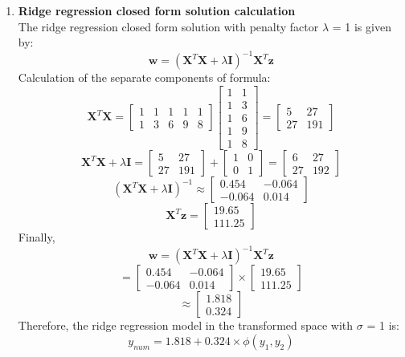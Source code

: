 \documentclass{article}
\begin{document}
\begin{enumerate}[leftmargin=\labelsep]
\item 
\textbf{Ridge regression closed form solution calculation}\\
The ridge regression closed form solution with penalty factor $\lambda$ = 1 is given by:
\[\boldsymbol{w} = (\mathbf{X}^T \mathbf{X} + \lambda \mathbf{I})^{-1} \mathbf{X}^T \mathbf{z}\]
Calculation of the separate components of formula:
\[
\mathbf{X}^T \mathbf{X} = 
\begin{bmatrix}
1 & 1 & 1 & 1 & 1 \\
1 & 3 & 6 & 9 & 8
\end{bmatrix}
\begin{bmatrix}
1 & 1 \\
1 & 3 \\
1 & 6 \\
1 & 9 \\
1 & 8
\end{bmatrix}
=
\begin{bmatrix}
5 & 27 \\
27 & 191
\end{bmatrix}
\]
\[\mathbf{X}^T \mathbf{X} + \lambda \mathbf{I} = \begin{bmatrix}
5 & 27 \\
27 & 191
\end{bmatrix} + \begin{bmatrix}
1 & 0 \\
0 & 1
\end{bmatrix} = \begin{bmatrix}
6 & 27 \\
27 & 192
\end{bmatrix}\]
\[(\mathbf{X}^T \mathbf{X} + \lambda \mathbf{I})^{-1} \approx \begin{bmatrix}
0.454 & -0.064 \\
-0.064 & 0.014
\end{bmatrix}\]
\[\mathbf{X}^T \mathbf{z} = \begin{bmatrix}
19.65 \\
111.25
\end{bmatrix}\]
Finally,
\[\boldsymbol{w} = (\mathbf{X}^T \mathbf{X} + \lambda \mathbf{I})^{-1} \mathbf{X}^T \mathbf{z}\]
\[= \begin{bmatrix}
0.454 & -0.064 \\
-0.064 & 0.014
\end{bmatrix} \times \begin{bmatrix}
19.65 \\
111.25
\end{bmatrix}\]
\[\approx \begin{bmatrix}
1.818\\
0.324
\end{bmatrix}\]
Therefore, the ridge regression model in the transformed space with $\sigma$ = 1 is:
\[y_{num} = 1.818 + 0.324 \times \phi(y_1, y_2)\]


\end{enumerate}
\end{document}
